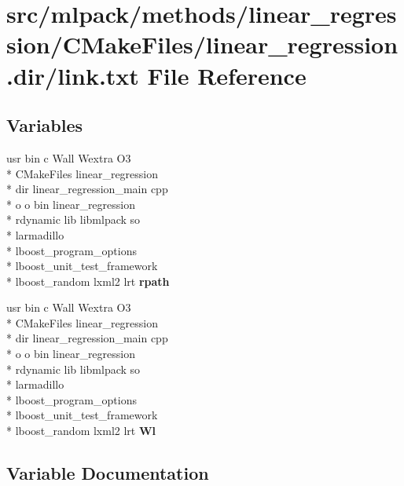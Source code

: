 \section{src/mlpack/methods/linear\-\_\-regression/\-C\-Make\-Files/linear\-\_\-regression.dir/link.txt File Reference}
\label{methods_2linear__regression_2CMakeFiles_2linear__regression_8dir_2link_8txt}
\subsection*{Variables}
\begin{DoxyCompactItemize}
\item 
usr bin c Wall Wextra O3 \\*
C\-Make\-Files linear\-\_\-regression \\*
dir linear\-\_\-regression\-\_\-main cpp \\*
o o bin linear\-\_\-regression \\*
rdynamic lib libmlpack so \\*
larmadillo \\*
lboost\-\_\-program\-\_\-options \\*
lboost\-\_\-unit\-\_\-test\-\_\-framework \\*
lboost\-\_\-random lxml2 lrt {\bf rpath}
\item 
usr bin c Wall Wextra O3 \\*
C\-Make\-Files linear\-\_\-regression \\*
dir linear\-\_\-regression\-\_\-main cpp \\*
o o bin linear\-\_\-regression \\*
rdynamic lib libmlpack so \\*
larmadillo \\*
lboost\-\_\-program\-\_\-options \\*
lboost\-\_\-unit\-\_\-test\-\_\-framework \\*
lboost\-\_\-random lxml2 lrt {\bf Wl}
\end{DoxyCompactItemize}


\subsection{Variable Documentation}
